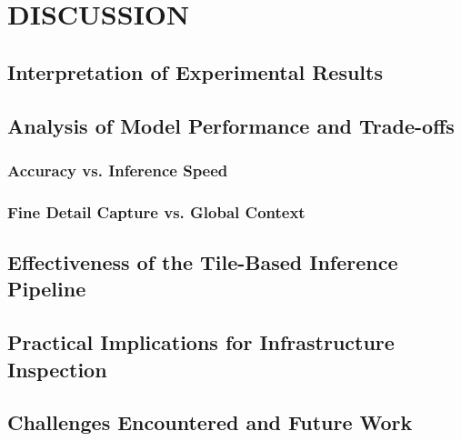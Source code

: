 \chapter{DISCUSSION}

\section{Interpretation of Experimental Results}

\section{Analysis of Model Performance and Trade-offs}
\subsection{Accuracy vs. Inference Speed}
\subsection{Fine Detail Capture vs. Global Context}

\section{Effectiveness of the Tile-Based Inference Pipeline}

\section{Practical Implications for Infrastructure Inspection}

\section{Challenges Encountered and Future Work}